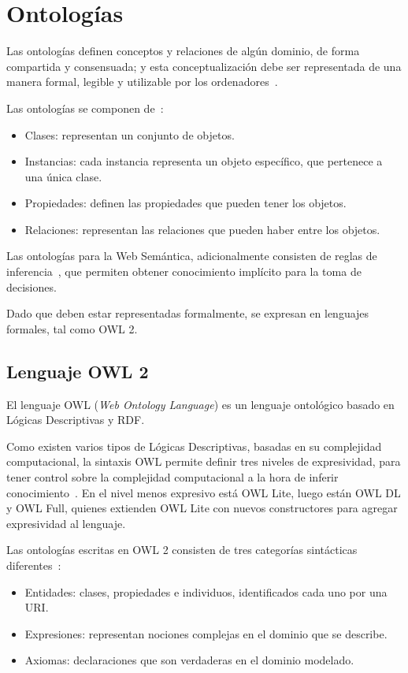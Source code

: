 \section{Ontologías}
Las ontologías definen conceptos y relaciones de algún dominio, de forma compartida y consensuada; y  esta conceptualización debe ser representada de una manera formal, legible y utilizable por los ordenadores~\cite{tello2001ontologias}. 

Las ontologías se componen de~\cite{llop2007especificacion}:
\begin{itemize}
    \item Clases: representan un conjunto de objetos.
    \item Instancias: cada instancia representa un objeto específico, que pertenece a una única clase.
    \item Propiedades: definen las propiedades que pueden tener los objetos.
    \item Relaciones: representan las relaciones que pueden haber entre los objetos.
\end{itemize}
Las ontologías para la Web Semántica, adicionalmente consisten  de reglas de inferencia~\cite{SWBernersLee}, que permiten obtener conocimiento implícito para la toma de decisiones.

Dado que deben estar representadas formalmente, se expresan en lenguajes formales, tal como OWL 2.

\subsection{Lenguaje OWL 2}
El lenguaje OWL (\emph{Web Ontology Language}) es un lenguaje ontológico basado en Lógicas Descriptivas y RDF. 

Como existen varios tipos de Lógicas Descriptivas, basadas en su complejidad computacional, la sintaxis OWL permite definir tres niveles de expresividad, para tener control sobre la complejidad computacional a la hora de inferir conocimiento~\cite{tello2001ontologias}. En el nivel menos expresivo está OWL Lite, luego están OWL DL y OWL Full, quienes extienden OWL Lite con nuevos constructores para agregar expresividad al lenguaje.

Las ontologías escritas en OWL 2 consisten de tres categorías sintácticas diferentes~\cite{OWL2W3C}:
\begin{itemize}
    \item Entidades: clases, propiedades e individuos, identificados cada uno por una URI.
    \item Expresiones: representan nociones complejas en el dominio que se describe.
    \item Axiomas: declaraciones que son verdaderas en el dominio modelado.
\end{itemize}



